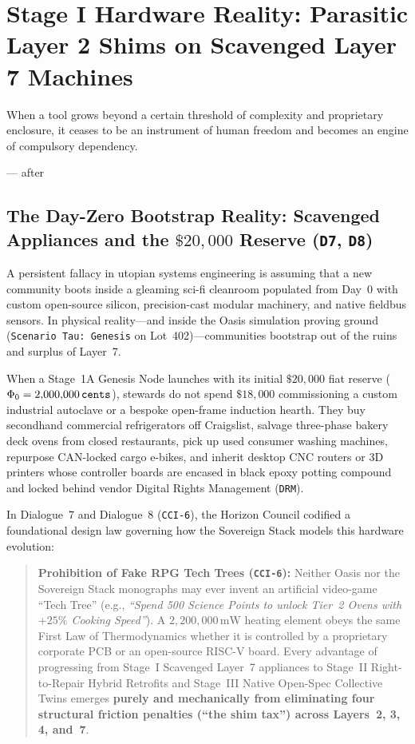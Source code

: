 \chapter{Stage I Hardware Reality: Parasitic Layer 2 Shims on Scavenged Layer 7 Machines}
\label{ch:stage1-scavenged-shims}

\epigraph{When a tool grows beyond a certain threshold of complexity and proprietary enclosure, it ceases to be an instrument of human freedom and becomes an engine of compulsory dependency.}{--- after \textcite{illich1973}}

\section{The Day-Zero Bootstrap Reality: Scavenged Appliances and the $\$20{,}000$ Reserve (\texttt{D7}, \texttt{D8})}
\label{sec:l2-stage1-boot-reality}

A persistent fallacy in utopian systems engineering is assuming that a new community boots inside a gleaming sci-fi cleanroom populated from Day~0 with custom open-source silicon, precision-cast modular machinery, and native fieldbus sensors. In physical reality---and inside the Oasis simulation proving ground (\texttt{Scenario Tau: Genesis} on Lot~402)---communities bootstrap out of the ruins and surplus of Layer~7.

When a Stage~1A Genesis Node launches with its initial $\$20{,}000$ fiat reserve ($\Phi_0 = 2{,}000{,}000\,\text{\texttt{cents}}$), stewards do not spend $\$18{,}000$ commissioning a custom industrial autoclave or a bespoke open-frame induction hearth. They buy secondhand commercial refrigerators off Craigslist, salvage three-phase bakery deck ovens from closed restaurants, pick up used consumer washing machines, repurpose CAN-locked cargo e-bikes, and inherit desktop CNC routers or 3D printers whose controller boards are encased in black epoxy potting compound and locked behind vendor Digital Rights Management (\texttt{DRM}).

In Dialogue~7 and Dialogue~8 (\texttt{CCI-6}), the Horizon Council codified a foundational design law governing how the Sovereign Stack models this hardware evolution:

\begin{quote}
\textbf{Prohibition of Fake RPG Tech Trees (\texttt{CCI-6}):} Neither Oasis nor the Sovereign Stack monographs may ever invent an artificial video-game ``Tech Tree'' (e.g., \textit{``Spend 500 Science Points to unlock Tier~2 Ovens with $+25\%$ Cooking Speed''}). A $2{,}200{,}000\,\mathrm{mW}$ heating element obeys the same First Law of Thermodynamics whether it is controlled by a proprietary corporate PCB or an open-source RISC-V board. Every advantage of progressing from Stage~I Scavenged Layer~7 appliances to Stage~II Right-to-Repair Hybrid Retrofits and Stage~III Native Open-Spec Collective Twins emerges \textbf{purely and mechanically from eliminating four structural friction penalties (``the shim tax'') across Layers~2, 3, 4, and~7}.
\end{quote}

